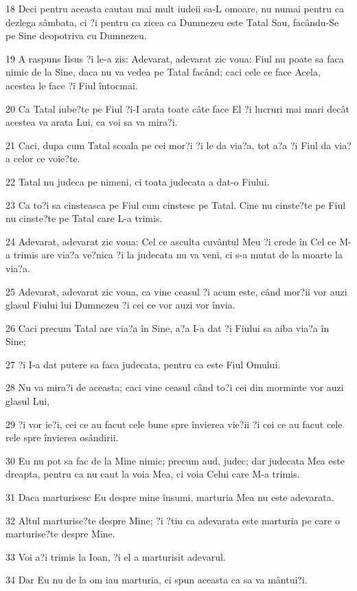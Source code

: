 \par 18 Deci pentru aceasta cautau mai mult iudeii sa-L omoare, nu numai pentru ca dezlega sâmbata, ci ?i pentru ca zicea ca Dumnezeu este Tatal Sau, facându-Se pe Sine deopotriva cu Dumnezeu.
\par 19 A raspuns Iisus ?i le-a zis: Adevarat, adevarat zic voua: Fiul nu poate sa faca nimic de la Sine, daca nu va vedea pe Tatal facând; caci cele ce face Acela, acestea le face ?i Fiul întocmai.
\par 20 Ca Tatal iube?te pe Fiul ?i-I arata toate câte face El ?i lucruri mai mari decât acestea va arata Lui, ca voi sa va mira?i.
\par 21 Caci, dupa cum Tatal scoala pe cei mor?i ?i le da via?a, tot a?a ?i Fiul da via?a celor ce voie?te.
\par 22 Tatal nu judeca pe nimeni, ci toata judecata a dat-o Fiului.
\par 23 Ca to?i sa cinsteasca pe Fiul cum cinstesc pe Tatal. Cine nu cinste?te pe Fiul nu cinste?te pe Tatal care L-a trimis.
\par 24 Adevarat, adevarat zic voua: Cel ce asculta cuvântul Meu ?i crede în Cel ce M-a trimis are via?a ve?nica ?i la judecata nu va veni, ci s-a mutat de la moarte la via?a.
\par 25 Adevarat, adevarat zic voua, ca vine ceasul ?i acum este, când mor?ii vor auzi glasul Fiului lui Dumnezeu ?i cei ce vor auzi vor învia.
\par 26 Caci precum Tatal are via?a în Sine, a?a I-a dat ?i Fiului sa aiba via?a în Sine;
\par 27 ?i I-a dat putere sa faca judecata, pentru ca este Fiul Omului.
\par 28 Nu va mira?i de aceasta; caci vine ceasul când to?i cei din morminte vor auzi glasul Lui,
\par 29 ?i vor ie?i, cei ce au facut cele bune spre învierea vie?ii ?i cei ce au facut cele rele spre învierea osândirii.
\par 30 Eu nu pot sa fac de la Mine nimic; precum aud, judec; dar judecata Mea este dreapta, pentru ca nu caut la voia Mea, ci voia Celui care M-a trimis.
\par 31 Daca marturisesc Eu despre mine însumi, marturia Mea nu este adevarata.
\par 32 Altul marturise?te despre Mine; ?i ?tiu ca adevarata este marturia pe care o marturise?te despre Mine.
\par 33 Voi a?i trimis la Ioan, ?i el a marturisit adevarul.
\par 34 Dar Eu nu de la om iau marturia, ci spun aceasta ca sa va mântui?i.
